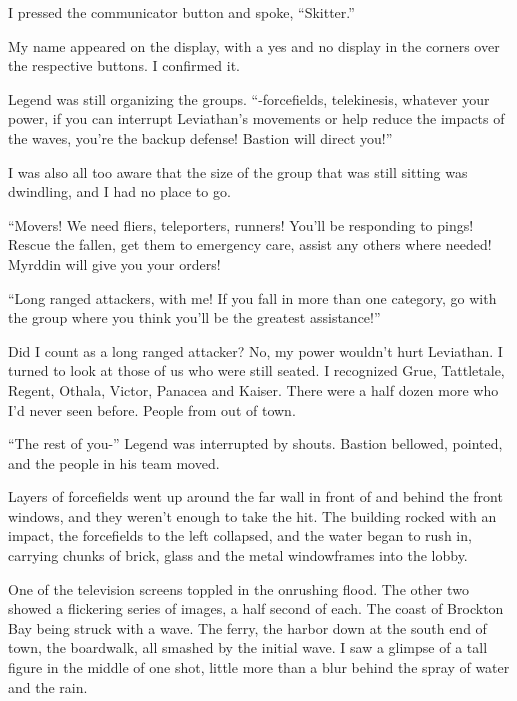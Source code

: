 I pressed the communicator button and spoke, ``Skitter.''



My name appeared on the display, with a yes and no display in the corners over the respective buttons.  I confirmed it.



Legend was still organizing the groups.  ``-forcefields, telekinesis, whatever your power, if you can interrupt Leviathan's movements or help reduce the impacts of the waves, you're the backup defense!  Bastion will direct you!''



I was also all too aware that the size of the group that was still sitting was dwindling, and I had no place to go.



``Movers!  We need fliers, teleporters, runners!  You'll be responding to pings!  Rescue the fallen, get them to emergency care, assist any others where needed!  Myrddin will give you your orders!



``Long ranged attackers, with me!  If you fall in more than one category, go with the group where you think you'll be the greatest assistance!''



Did I count as a long ranged attacker?  No, my power wouldn't hurt Leviathan.  I turned to look at those of us who were still seated.  I recognized Grue, Tattletale, Regent, Othala, Victor, Panacea and Kaiser.  There were a half dozen more who I'd never seen before.  People from out of town.



``The rest of you-'' Legend was interrupted by shouts.  Bastion bellowed, pointed, and the people in his team moved.



Layers of forcefields went up around the far wall in front of and behind the front windows, and they weren't enough to take the hit.  The building rocked with an impact, the forcefields to the left collapsed, and the water began to rush in, carrying chunks of brick, glass and the metal windowframes into the lobby.



One of the television screens toppled in the onrushing flood.  The other two showed a flickering series of images, a half second of each.  The coast of Brockton Bay being struck with a wave.  The ferry, the harbor down at the south end of town, the boardwalk, all smashed by the initial wave.  I saw a glimpse of a tall figure in the middle of one shot, little more than a blur behind the spray of water and the rain.



